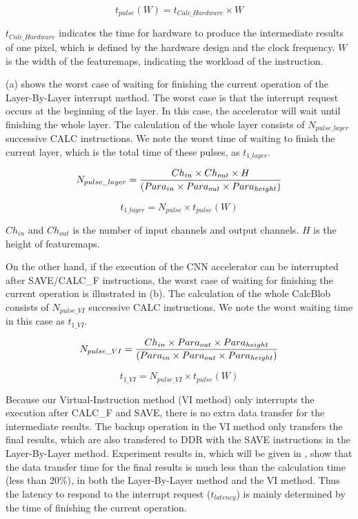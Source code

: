 \begin{equation}
	t_{pulse}(W) = t_{Calc\_Hardware} \times W
\end{equation}

$t_{Calc\_Hardware}$ indicates the time for hardware to produce the intermediate results of one pixel, which is defined by the hardware design and the clock frequency. $W$ is the width of the featuremaps, indicating the workload of the instruction.

(a) shows the worst case of waiting for finishing the current operation of the Layer-By-Layer interrupt method. The worst case is that the interrupt request occurs at the beginning of the layer. In this case, the accelerator will wait until finishing the whole layer. The calculation of the whole layer consists of $N_{pulse\_layer}$ successive CALC instructions. We note the worst time of waiting to finish the current layer, which is the total time of these pulses, as $t_{1\_layer}$.

\begin{equation}
	\small
	N_{pulse\_layer} = \frac{ Ch_{in} \times Ch_{out} \times H }{ (Para_{in} \times Para_{out} \times Para_{height}) } 
\end{equation}

\begin{equation}
t_{1\_layer} = N_{pulse} \times t_{pulse}(W)
\end{equation}

$Ch_{in}$ and $Ch_{out}$ is the number of input channels and output channels. $H$ is the height of featuremaps.

On the other hand, if the execution of the CNN accelerator can be interrupted after SAVE/CALC\_F instructions, the worst case of waiting for finishing the current operation is illustrated in (b). The calculation of the whole CalcBlob consists of $N_{pulse\_VI}$ successive CALC instructions. We note the worst waiting time in this case as $t_{1\_VI}$.

\begin{equation}
	\small
	N_{pulse\_VI} = \frac{ Ch_{in} \times Para_{out} \times Para_{height} }{ (Para_{in} \times Para_{out} \times Para_{height}) } 
\end{equation}

\begin{equation}
t_{1\_VI} = N_{pulse\_VI} \times t_{pulse}(W)
\end{equation}


Because our Virtual-Instruction method (VI method) only interrupts the execution after CALC\_F and SAVE, there is no extra data transfer for the intermediate results. The backup operation in the VI method only transfers the final results, which are also transfered to DDR with the SAVE instructions in the Layer-By-Layer method. Experiment results in, which will be given in , show that the data transfer time for the final results is much less than the calculation time (less than 20\%), in both the Layer-By-Layer method and the VI method. Thus the latency to respond to the interrupt request ($t_{latency}$) is mainly determined by the time of finishing the current operation.

